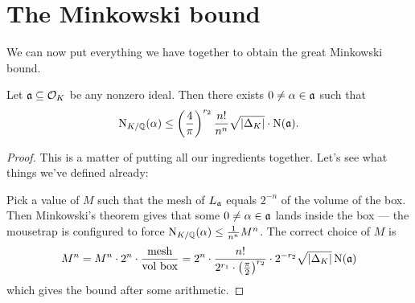 \section{The Minkowski bound}
We can now put everything we have together to obtain the great Minkowski bound.
\begin{theorem}
	Let $\mathfrak a \subseteq \mathcal O_K$ be any nonzero ideal.
	Then there exists $0 \neq \alpha \in \mathfrak a$ such that
	\[ \operatorname{N}_{K/\mathbb Q}(\alpha) \le \left( \frac 4\pi \right)^{r_2} \frac{n!}{n^n} \sqrt{\left\lvert \Delta_K \right\rvert}
	\cdot \operatorname{N}(\mathfrak a). \]
\end{theorem}
\begin{proof}
	This is a matter of putting all our ingredients together.
	Let's see what things we've defined already:
	\begin{center}
	\end{center}
	Pick a value of $M$ such that the mesh of $L_\mathfrak a$
	equals $2^{-n}$ of the volume of the box.
	Then Minkowski's theorem gives that some $0 \neq \alpha \in \mathfrak a$ lands inside the box ---
	the mousetrap is configured to force $\operatorname{N}_{K/\mathbb Q}(\alpha) \le \frac{1}{n^n} M^n$.
	The correct choice of $M$ is
	\[
		M^n
		= M^n \cdot 2^n \cdot \frac{\text{mesh}}{\text{vol box}}
		= 2^n \cdot \frac{n!}{2^{r_1} \cdot \left( \frac \pi 2 \right)^{r_2}}
		\cdot 2^{-r_2} \sqrt{\left\lvert \Delta_K \right\rvert} \operatorname{N}(\mathfrak a) 
	\]
	which gives the bound after some arithmetic.
\end{proof}

